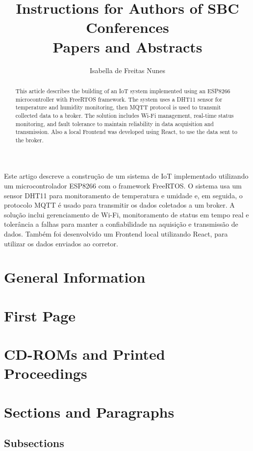 \documentclass[12pt]{article}
\title{Instructions for Authors of SBC Conferences\\ Papers and Abstracts}
\author{Isabella de Freitas Nunes\inst{1}}
\begin{document}
 

\maketitle

\begin{abstract}
  This article describes the building of an IoT system implemented using an ESP8266 microcontroller with FreeRTOS framework. The system uses a DHT11 sensor for temperature and humidity monitoring, then MQTT protocol is used to transmit collected data to a broker. The solution includes Wi-Fi management, real-time status monitoring, and fault tolerance to maintain reliability in data acquisition and transmission. Also a local Frontend was developed using React, to use the data sent to the broker.
\end{abstract}
     
\begin{resumo} 
  Este artigo descreve a construção de um sistema de IoT implementado utilizando um microcontrolador ESP8266 com o framework FreeRTOS. O sistema usa um sensor DHT11 para monitoramento de temperatura e umidade e, em seguida, o protocolo MQTT é usado para transmitir os dados coletados a um broker. A solução inclui gerenciamento de Wi-Fi, monitoramento de status em tempo real e tolerância a falhas para manter a confiabilidade na aquisição e transmissão de dados. Também foi desenvolvido um Frontend local utilizando React, para utilizar os dados enviados ao corretor.
\end{resumo}

\section{General Information}
\section{First Page} \label{sec:firstpage}
\section{CD-ROMs and Printed Proceedings}
\section{Sections and Paragraphs}
\subsection{Subsections}
\end{document}
